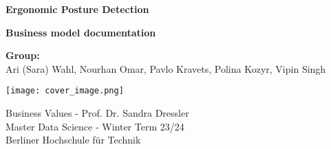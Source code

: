\begin{titlepage}
    \begin{center}
        \vspace*{1cm}
        
        \Huge
        \textbf{Ergonomic Posture Detection}
        
        \vspace{0.5cm}
        \LARGE
        \textbf{Business model documentation}
        
        \vspace{1.5cm}
        \Large
        \textbf{Group:}\\
        Ari (Sara) Wahl, Nourhan Omar, Pavlo Kravets, Polina Kozyr, Vipin Singh
        
        \vfill
        \texttt{[image: cover\_image.png]}
        \vfill
        
        \Large
        Business Values - Prof. Dr. Sandra Dressler\\
        Master Data Science - Winter Term 23/24\\
        Berliner Hochschule für Technik
        
    \end{center}
\end{titlepage}